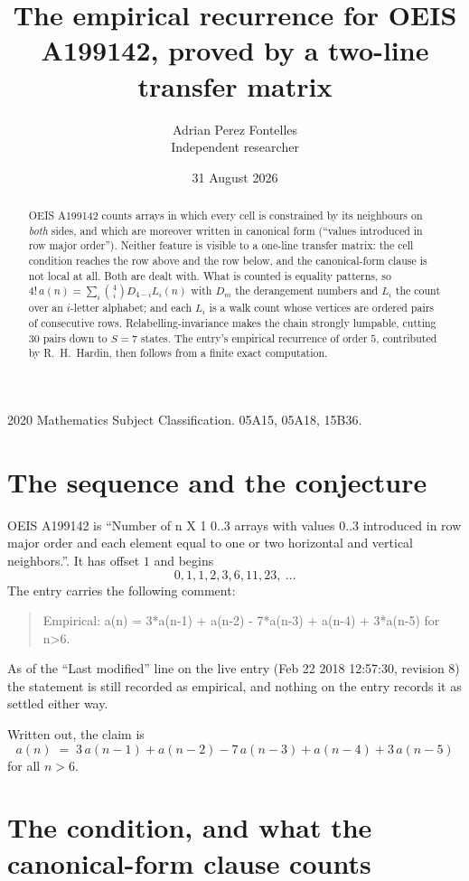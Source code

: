 \documentclass[11pt,a4paper]{article}
\title{The empirical recurrence for OEIS A199142, proved by a two-line transfer matrix}
\author{Adrian Perez Fontelles\\ \small Independent researcher}
\date{31 August 2026}
\theoremstyle{plain}
\theoremstyle{definition}
\begin{document}
\maketitle

\begin{abstract}
OEIS A199142 counts arrays in which every cell is constrained by its neighbours on \emph{both}
sides, and which are moreover written in canonical form (``values introduced in row major
order''). Neither feature is visible to a one-line transfer matrix: the cell condition
reaches the row above and the row below, and the canonical-form clause is not local at
all. Both are dealt with. What is counted is equality patterns, so
$4!\,a(n)=\sum_i\binom{4}{i}D_{4-i}L_i(n)$ with $D_m$ the derangement numbers and
$L_i$ the count over an $i$-letter alphabet; and each $L_i$ is a walk count whose vertices
are ordered pairs of consecutive rows. Relabelling-invariance makes the chain strongly
lumpable, cutting $30$ pairs down to $S=7$ states. The entry's empirical recurrence of
order $5$, contributed by R.~H.~Hardin, then follows from a finite exact computation.
\end{abstract}

\noindent\small 2020 Mathematics Subject Classification. 05A15, 05A18, 15B36.\normalsize

\section{The sequence and the conjecture}

OEIS A199142 is ``Number of n X 1 0..3 arrays with values 0..3 introduced in row major order and each element equal to one or two horizontal and vertical neighbors.''. It has offset $1$ and begins
\[
0, 1, 1, 2, 3, 6, 11, 23,\ \dots
\]
The entry carries the following comment:
\begin{quote}\small
Empirical: a(n) = 3*a(n-1) + a(n-2) - 7*a(n-3) + a(n-4) + 3*a(n-5) for n>6.
\end{quote}
As of the ``Last modified'' line on the live entry (Feb 22 2018 12:57:30, revision 8) the statement is
still recorded as empirical, and nothing on the entry records it as settled either way.

Written out, the claim is
\begin{equation}\label{eq:conj}
a(n)\;=\;3\,a(n-1) + a(n-2) - 7\,a(n-3) + a(n-4) + 3\,a(n-5)
\end{equation}
for all $n>6$.

\section{The condition, and what the canonical-form clause counts}
\end{document}
